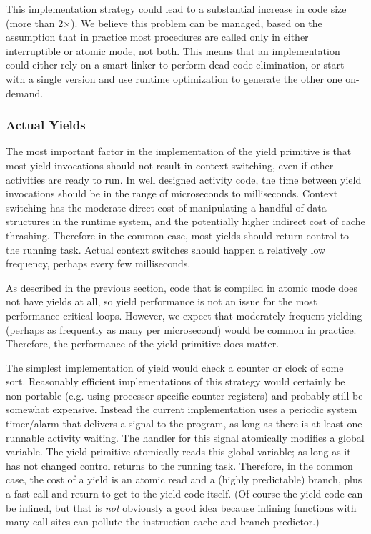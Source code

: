 \documentclass[acmsmall,anonymous,review]{acmart}\settopmatter{printfolios=true,printccs=false,printacmref=false}
\begin{document}
This implementation strategy could lead to a substantial increase in code size (more than 2$\times$).
We believe this problem can be managed, based on the assumption that in practice most procedures are called only in either interruptible or atomic mode, not both.
This means that an implementation could either rely on a smart linker to perform dead code elimination, or start with a single version and use runtime optimization to generate the other one on-demand.

\subsubsection{Actual Yields}

The most important factor in the implementation of the yield primitive is that most yield invocations should not result in context switching, even if other activities are ready to run.
In well designed activity code, the time between yield invocations should be in the range of microseconds to milliseconds.
Context switching has the moderate direct cost of manipulating a handful of data structures in the runtime system, and the potentially higher indirect cost of cache thrashing.
Therefore in the common case, most yields should return control to the running task.
Actual context switches should happen a relatively low frequency, perhaps every few milliseconds.

As described in the previous section, code that is compiled in atomic mode does not have yields at all, so yield performance is not an issue for the most performance critical loops.
However, we expect that moderately frequent yielding (perhaps as frequently as many per microsecond) would be common in practice.
Therefore, the performance of the yield primitive does matter.

The simplest implementation of yield would check a counter or clock of some sort.
Reasonably efficient implementations of this strategy would certainly be non-portable (e.g. using processor-specific counter registers) and probably still be somewhat expensive.
Instead the current \charcoal{} implementation uses a periodic system timer/alarm that delivers a signal to the program, as long as there is at least one runnable activity waiting.
The handler for this signal atomically modifies a global variable.
The yield primitive atomically reads this global variable; as long as it has not changed control returns to the running task.
Therefore, in the common case, the cost of a yield is an atomic read and a (highly predictable) branch, plus a fast call and return to get to the yield code itself.
(Of course the yield code can be inlined, but that is \emph{not} obviously a good idea because inlining functions with many call sites can pollute the instruction cache and branch predictor.)
\end{document}
